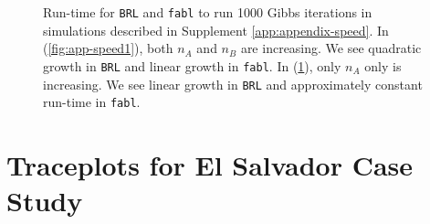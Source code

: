 \documentclass[ba,preprint]{imsart}
\begin{document}
\begin{figure}[h]
\begin{subfigure}{.5\textwidth}
		\caption{}
		\label{fig:app-speed2}
	\end{subfigure}
	\caption{Run-time for \texttt{BRL} and \texttt{fabl} to run 1000 Gibbs iterations in simulations described in Supplement \ref{app:appendix-speed}. In (\ref{fig:app-speed1}), both $n_A$ and $n_B$ are increasing. We see quadratic growth in \texttt{BRL} and linear growth in \texttt{fabl}. In (\ref{fig:app-speed2}), only $n_A$ only is increasing. We see linear growth in \texttt{BRL} and approximately constant run-time in \texttt{fabl}.}
	\label{fig:app-speed_sims}
\end{figure}

\clearpage

	\hypertarget{appendix-es}{%
		\section{Traceplots for El Salvador Case Study}\label{app:appendix-es}}
	
\end{document}
